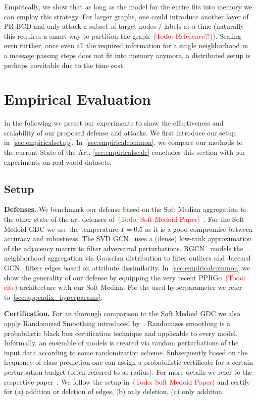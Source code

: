 \documentclass{article} %
\newcommand{\todo}[1]{\textcolor{red}{(Todo: #1)}}
\begin{document}
Empirically, we show that as long as the model for the entire fits into memory we can employ this strategy. For larger graphs, one could introduce another layer of PR-BCD and only attack a subset of target nodes / labels at a time (naturally this requires a smart way to partition the graph~\todo{Reference?!}). Scaling even further, once even all the required information for a single neighborhood in a message passing steps does not fit into memory anymore, a distributed setup is perhaps inevitable due to the time cost.

\section{Empirical Evaluation}\label{sec:empirical}

In the following we preset our experiments to show the effectiveness and scalability of our proposed defense and attacks. We first introduce our setup in~\autoref{sec:empiricalsetup}. In~\autoref{sec:empiricalcommon}, we compare our methods to the current State of the Art. \autoref{sec:empiricalscale} concludes this section with our experiments on real-world datasets.

\subsection{Setup}\label{sec:empiricalsetup}

\textbf{Defenses.} We benchmark our defense based on the Soft Median aggregation to the other state of the art defenses of~\todo{Soft Medoid Paper}~\citep{Entezari2020, Wu2019, Zhu2019}. For the Soft Medoid GDC we use the temperature \(T=0.5\) as it is a good compromise between accuracy and robustness. The SVD GCN~\citep{Entezari2020} uses a (dense) low-rank approximation of the adjacency matrix to filter adversarial perturbations. RGCN~\citep{Zhu2019} models the neighborhood aggregation via Gaussian distribution to filter outliers and Jaccard GCN~\citep{Wu2019} filters edges based on attribute dissimilarity. In~\autoref{sec:empiricalcommon} we show the generality of our defense by equipping the very recent PPRGo~\todo{cite} architecture with our Soft Median. For the used hyperparameter we refer to~\autoref{sec:appendix_hyperparams}.

\textbf{Certification.} For an thorough comparison to the Soft Medoid GDC we also apply Randomized Smoothing introduced by~\citep{Bojchevski2020}. Randomizes smoothing is a probabilistic black box certification technique and applicable to every model. Informally, an ensemble of models is created via random perturbations of the input data according to some randomization scheme. Subsequently based on the frequency of class prediction one can assign a probabilistic certificate for a certain perturbation budget (often referred to as radius). For more details we refer to the respective paper~\citep{Bojchevski2020}. We follow the setup in~\todo{Soft Medoid Paper} and certify for (a) addition or deletion of edges, (b) only deletion, (c) only addition.
\end{document}
